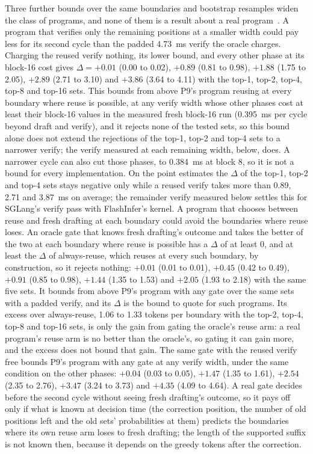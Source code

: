 Three further bounds over the same boundaries and bootstrap resamples widen the class of programs, and none of them is a result about a real program~. A program that verifies only the remaining positions at a smaller width could pay less for its second cycle than the padded 4.73~ms verify the oracle charges. Charging the reused verify nothing, its lower bound, and every other phase at its block-16 cost gives $\Delta=+0.01$ (0.00 to 0.02), $+0.89$ (0.81 to 0.98), $+1.88$ (1.75 to 2.05), $+2.89$ (2.71 to 3.10) and $+3.86$ (3.64 to 4.11) with the top-1, top-2, top-4, top-8 and top-16 sets. This bounds from above P9's program reusing at every boundary where reuse is possible, at any verify width whose other phases cost at least their block-16 values in the measured fresh block-16 run (0.395~ms per cycle beyond draft and verify), and it rejects none of the tested sets, so this bound alone does not extend the rejections of the top-1, top-2 and top-4 sets to a narrower verify; the verify measured at each remaining width, below, does. A narrower cycle can also cut those phases, to 0.384~ms at block 8, so it is not a bound for every implementation. On the point estimates the $\Delta$ of the top-1, top-2 and top-4 sets stays negative only while a reused verify takes more than 0.89, 2.71 and 3.87~ms on average; the remainder verify measured below settles this for SGLang's verify pass with FlashInfer's kernel. A program that chooses between reuse and fresh drafting at each boundary could avoid the boundaries where reuse loses. An oracle gate that knows fresh drafting's outcome and takes the better of the two at each boundary where reuse is possible has a $\Delta$ of at least 0, and at least the $\Delta$ of always-reuse, which reuses at every such boundary, by construction, so it rejects nothing: $+0.01$ (0.01 to 0.01), $+0.45$ (0.42 to 0.49), $+0.91$ (0.85 to 0.98), $+1.44$ (1.35 to 1.53) and $+2.05$ (1.93 to 2.18) with the same five sets. It bounds from above P9's program with any gate over the same sets with a padded verify, and its $\Delta$ is the bound to quote for such programs. Its excess over always-reuse, 1.06 to 1.33 tokens per boundary with the top-2, top-4, top-8 and top-16 sets, is only the gain from gating the oracle's reuse arm: a real program's reuse arm is no better than the oracle's, so gating it can gain more, and the excess does not bound that gain. The same gate with the reused verify free bounds P9's program with any gate at any verify width, under the same condition on the other phases: $+0.04$ (0.03 to 0.05), $+1.47$ (1.35 to 1.61), $+2.54$ (2.35 to 2.76), $+3.47$ (3.24 to 3.73) and $+4.35$ (4.09 to 4.64). A real gate decides before the second cycle without seeing fresh drafting's outcome, so it pays off only if what is known at decision time (the correction position, the number of old positions left and the old sets' probabilities at them) predicts the boundaries where its own reuse arm loses to fresh drafting; the length of the supported suffix is not known then, because it depends on the greedy tokens after the correction.

